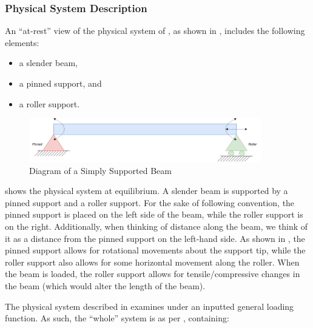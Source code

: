\documentclass[12pt]{article}
\begin{document}
\subsubsection{Physical System Description}
\label{sec_phySystDescrip}

An ``at-rest'' view of the physical system of \progname{}, as shown in
, includes the following elements:

\begin{itemize}

    \item a slender beam,

    \item a pinned support, and

    \item a roller support.

\end{itemize}

\begin{figure}[H]
    \begin{center}
        \includegraphics[width=0.9\textwidth]{temp/beam_bending_diagram.drawio.png}
        \caption{\label{beam_bending_diagram} Diagram of a Simply Supported Beam}
    \end{center}
\end{figure}

 shows the physical system at equilibrium. A slender
beam is supported by a pinned support and a roller support. For the sake of
following convention, the pinned support is placed on the left side of the beam,
while the roller support is on the right. Additionally, when thinking of
distance along the beam, we think of it as a distance from the pinned support on
the left-hand side. As shown in , the pinned support
allows for rotational movements about the support tip, while the roller support
also allows for some horizontal movement along the roller. When the beam is
loaded, the roller support allows for tensile/compressive changes in the beam
(which would alter the length of the beam).

The physical system described in \progname{} examines
 under an inputted general loading function. As such,
the ``whole'' system is as per ,
containing:
\end{document}
